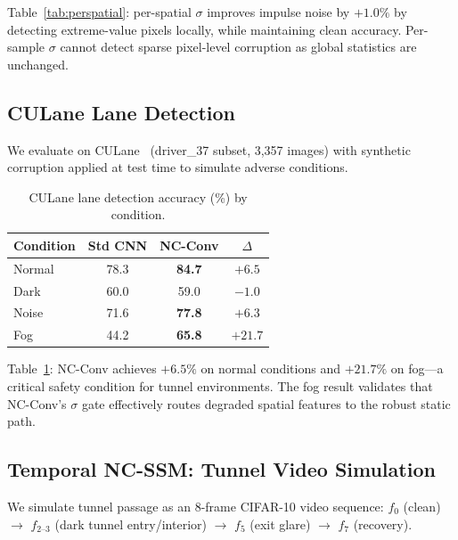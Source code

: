 \documentclass[runningheads]{llncs}
\begin{document}
Table~\ref{tab:perspatial}: per-spatial $\sigma$ improves impulse noise by $+1.0\%$ by detecting extreme-value pixels locally, while maintaining clean accuracy. Per-sample $\sigma$ cannot detect sparse pixel-level corruption as global statistics are unchanged.


\subsection{CULane Lane Detection}
\label{sec:culane}

We evaluate on CULane~\cite{pan2018culane} (driver\_37 subset, 3,357 images) with synthetic corruption applied at test time to simulate adverse conditions.

\begin{table}[t]
\centering
\caption{CULane lane detection accuracy (\%) by condition.}
\label{tab:culane}
\small
\begin{tabular}{@{}lccc@{}}
\toprule
\textbf{Condition} & \textbf{Std CNN} & \textbf{NC-Conv} & $\Delta$ \\
\midrule
Normal  & 78.3 & \textbf{84.7} & $+6.5$ \\
Dark    & 60.0 & 59.0 & $-1.0$ \\
Noise   & 71.6 & \textbf{77.8} & $+6.3$ \\
Fog     & 44.2 & \textbf{65.8} & $\mathbf{+21.7}$ \\
\bottomrule
\end{tabular}
\end{table}

Table~\ref{tab:culane}: NC-Conv achieves $+6.5\%$ on normal conditions and $\mathbf{+21.7\%}$ on fog---a critical safety condition for tunnel environments.
The fog result validates that NC-Conv's $\sigma$ gate effectively routes degraded spatial features to the robust static path.


\subsection{Temporal NC-SSM: Tunnel Video Simulation}
\label{sec:temporal_exp}

We simulate tunnel passage as an 8-frame CIFAR-10 video sequence: $f_0$ (clean) $\to$ $f_{2\text{--}3}$ (dark tunnel entry/interior) $\to$ $f_5$ (exit glare) $\to$ $f_7$ (recovery).
\end{document}

